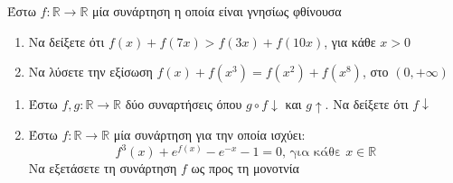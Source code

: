 \documentclass{presentation}
\begin{document}
\begin{askisi}
  Έστω $f:\mathbb{R}\to\mathbb{R}$ μία συνάρτηση η οποία είναι γνησίως φθίνουσα
  \begin{enumerate}
    \item Να δείξετε ότι $f(x)+f(7x)>f(3x)+f(10x)$, για κάθε $x>0$ \pause
    \item Να λύσετε την εξίσωση $f(x)+f(x^3)=f(x^2)+f(x^8)$, στο $(0,+\infty)$
  \end{enumerate}
\end{askisi}

\begin{askisi}

  \begin{enumerate}
    \item Έστω $f,g:\mathbb{R}\to\mathbb{R}$ δύο συναρτήσεις όπου $g\circ f \downarrow$ και $g\uparrow$. Να δείξετε ότι $f\downarrow$ \pause
    \item Έστω $f:\mathbb{R}\to\mathbb{R}$ μία συνάρτηση για την οποία ισχύει:
          $$f^3(x)+e^{f(x)}-e^{-x}-1=0\text{, για κάθε } x\in\mathbb{R}$$
          Να εξετάσετε τη συνάρτηση $f$ ως προς τη μονοτνία
  \end{enumerate}
\end{askisi}

\moodle
\end{document}
